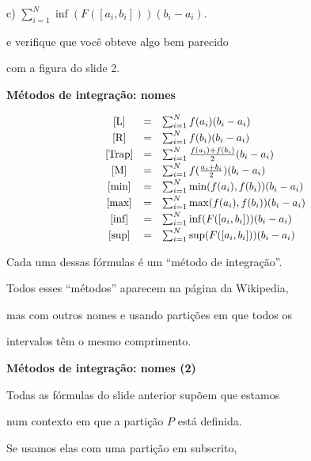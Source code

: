 \documentclass[oneside,12pt]{article}
\begin{document}
c) $\sum_{i=1}^{N} \inf(F([a_i,b_i])) (b_i - a_i)$.

\msk

e verifique que você obteve algo bem parecido

com a figura do slide 2.



\newpage


{\bf Métodos de integração: nomes}

\def\sumiN#1{\sum_{i=1}^N #1 (b_i-a_i)}
\def\mname#1{\text{[#1]}}
%
$$\scalebox{0.95}{$
  \begin{array}{ccl}
  \mname{L}    &=& \sumiN {f(a_i)}                    \\[2pt]
  \mname{R}    &=& \sumiN {f(b_i)}                    \\[2pt]
  \mname{Trap} &=& \sumiN {\frac{f(a_i) + f(b_i)}{2}} \\[2pt]
  \mname{M}    &=& \sumiN {f(\frac{a_i+b_i}{2})}      \\[2pt]
  \mname{min}  &=& \sumiN {\min(f(a_i), f(b_i))}      \\[2pt]
  \mname{max}  &=& \sumiN {\max(f(a_i), f(b_i))}      \\[2pt]
  \mname{inf}  &=& \sumiN {\inf(F([a_i,b_i]))}        \\[2pt]
  \mname{sup}  &=& \sumiN {\sup(F([a_i,b_i]))}        \\
  \end{array}
  $}
$$

Cada uma dessas fórmulas é um ``método de integração''.

Todos esses ``métodos'' aparecem na página da Wikipedia,

mas com outros nomes e usando partições em que todos os

intervalos têm o mesmo comprimento.

\newpage


{\bf Métodos de integração: nomes (2)}

\ssk

Todas as fórmulas do slide anterior supõem que estamos

num contexto em que a partição $P$ está definida.

Se usamos elas com uma partição em subscrito,
\end{document}
